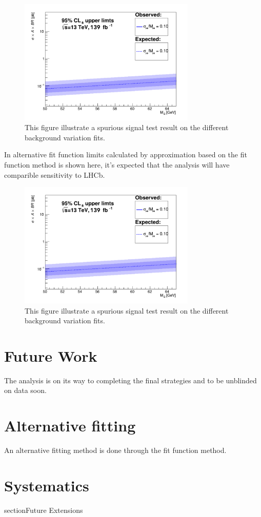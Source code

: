 \begin{figure}[!htb]
   \begin{center}
       \includegraphics[width=0.75\textwidth]{figures/chapter_dimuon/limits}       
       \caption{
       This figure illustrate a spurious signal test result on the different background variation fits.
       }
    \label{fig:dimuonstudies}
   \end{center}
\end{figure}

In alternative fit function limits calculated by approximation based on the fit function method is shown here, it's expected that the analysis will have comparible sensitivity to LHCb. 

\begin{figure}[!htb]
   \begin{center}
       \includegraphics[width=0.75\textwidth]{figures/chapter_dimuon/limits}
       \caption{
       This figure illustrate a spurious signal test result on the different background variation fits.}
            \label{fig:dimuonstudies}
   \end{center}
\end{figure}



\section{Future Work}
The analysis is on its way to completing the final strategies and to be unblinded on data soon.

\section{Alternative fitting}
An alternative fitting method is done through the fit function method.

\section{Systematics}
section{Future Extensions}

